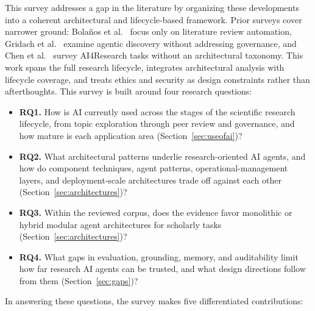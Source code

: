 \documentclass[sn-basic,Numbered]{sn-jnl}
\begin{document}
This survey addresses a gap in the literature by organizing these
developments into a coherent architectural and lifecycle-based
framework. Prior surveys cover narrower ground: Bola\~nos et al.\
\cite{bolanos2024ailitreview} focus only on literature review
automation, Gridach et al.\ \cite{gridach2025scientific} examine
agentic discovery without addressing governance, and Chen et al.\
\cite{chen2025ai4research} survey AI4Research tasks without an
architectural taxonomy. This work spans the full research lifecycle,
integrates architectural analysis with lifecycle coverage, and treats
ethics and security as design constraints rather than afterthoughts.
This survey is built around four research questions:
\begin{itemize}
\item \textbf{RQ1.} How is AI currently used across the stages of the scientific research lifecycle, from topic exploration through peer review and governance, and how mature is each application area (Section~\ref{sec:useofai})?
\item \textbf{RQ2.} What architectural patterns underlie research-oriented AI agents, and how do component techniques, agent patterns, operational-management layers, and deployment-scale architectures trade off against each other (Section~\ref{sec:architectures})?
\item \textbf{RQ3.} Within the reviewed corpus, does the evidence favor monolithic or hybrid modular agent architectures for scholarly tasks (Section~\ref{sec:architectures})?
\item \textbf{RQ4.} What gaps in evaluation, grounding, memory, and auditability limit how far research AI agents can be trusted, and what design directions follow from them (Section~\ref{sec:gaps})?
\end{itemize}
In answering these questions, the survey makes five differentiated contributions:
\end{document}
